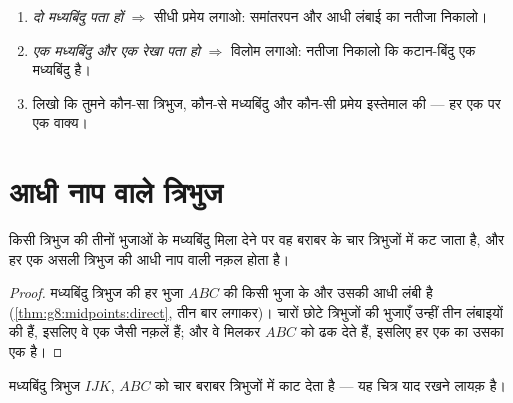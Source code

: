 \begin{method}[प्रमेय और विलोम में से चुनना]\label{met:g8:midpoints:choose}
\begin{enumerate}
  \item \emph{दो मध्यबिंदु पता हों} $\Rightarrow$ सीधी प्रमेय लगाओ:
        समांतरपन और आधी लंबाई का नतीजा निकालो।
  \item \emph{एक मध्यबिंदु और एक  रेखा पता हो} $\Rightarrow$
        विलोम लगाओ: नतीजा निकालो कि कटान-बिंदु एक मध्यबिंदु है।
  \item लिखो कि तुमने कौन-सा त्रिभुज, कौन-से मध्यबिंदु और कौन-सी
        प्रमेय इस्तेमाल की --- हर एक पर एक वाक्य।
\end{enumerate}
\end{method}

\section{आधी नाप वाले त्रिभुज}

\begin{proposition}[मध्यबिंदु त्रिभुज]\label{prop:g8:midpoints:medial}
किसी त्रिभुज की तीनों भुजाओं के मध्यबिंदु मिला देने पर वह बराबर
 के चार त्रिभुजों में कट जाता है, और हर एक असली त्रिभुज की
आधी नाप वाली नक़ल होता है।
\end{proposition}

\begin{proof}
मध्यबिंदु त्रिभुज की हर भुजा $ABC$ की किसी भुजा के  और उसकी
आधी लंबी है (\cref{thm:g8:midpoints:direct}, तीन बार लगाकर)। चारों
छोटे त्रिभुजों की भुजाएँ उन्हीं तीन लंबाइयों की हैं, इसलिए वे एक जैसी
नक़लें हैं; और वे मिलकर $ABC$ को ढक देते हैं, इसलिए हर एक का
 उसका एक  है।
\end{proof}

\begin{omfigure}

{\small मध्यबिंदु त्रिभुज $IJK$, $ABC$ को चार बराबर त्रिभुजों में
काट देता है --- यह चित्र याद रखने लायक़ है।}
\end{omfigure}

